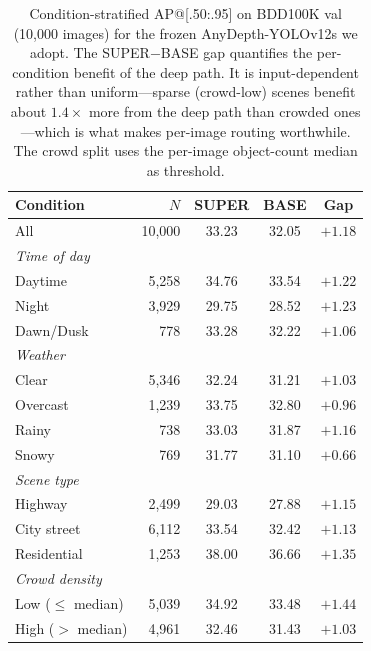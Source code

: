 \begin{table}[t]
\centering
\caption{Condition-stratified AP@[.50:.95] on BDD100K val (10,000 images) for the frozen AnyDepth-YOLOv12s we adopt. The SUPER$-$BASE gap quantifies the per-condition benefit of the deep path. It is input-dependent rather than uniform---sparse (crowd-low) scenes benefit about $1.4\times$ more from the deep path than crowded ones---which is what makes per-image routing worthwhile. The crowd split uses the per-image object-count median as threshold.}
\label{tab:condition_stratified}
\begin{tabular}{lrccc}
\toprule
Condition & $N$ & SUPER & BASE & Gap \\
\midrule
All & 10,000 & 33.23 & 32.05 & $+1.18$ \\
\midrule
\multicolumn{5}{l}{\emph{Time of day}} \\
\quad Daytime & 5,258 & 34.76 & 33.54 & $+1.22$ \\
\quad Night & 3,929 & 29.75 & 28.52 & $+1.23$ \\
\quad Dawn/Dusk & 778 & 33.28 & 32.22 & $+1.06$ \\
\midrule
\multicolumn{5}{l}{\emph{Weather}} \\
\quad Clear & 5,346 & 32.24 & 31.21 & $+1.03$ \\
\quad Overcast & 1,239 & 33.75 & 32.80 & $+0.96$ \\
\quad Rainy & 738 & 33.03 & 31.87 & $+1.16$ \\
\quad Snowy & 769 & 31.77 & 31.10 & $+0.66$ \\
\midrule
\multicolumn{5}{l}{\emph{Scene type}} \\
\quad Highway & 2,499 & 29.03 & 27.88 & $+1.15$ \\
\quad City street & 6,112 & 33.54 & 32.42 & $+1.13$ \\
\quad Residential & 1,253 & 38.00 & 36.66 & $+1.35$ \\
\midrule
\multicolumn{5}{l}{\emph{Crowd density}} \\
\quad Low ($\le$ median) & 5,039 & 34.92 & 33.48 & $+1.44$ \\
\quad High ($>$ median) & 4,961 & 32.46 & 31.43 & $+1.03$ \\
\bottomrule
\end{tabular}
\end{table}
